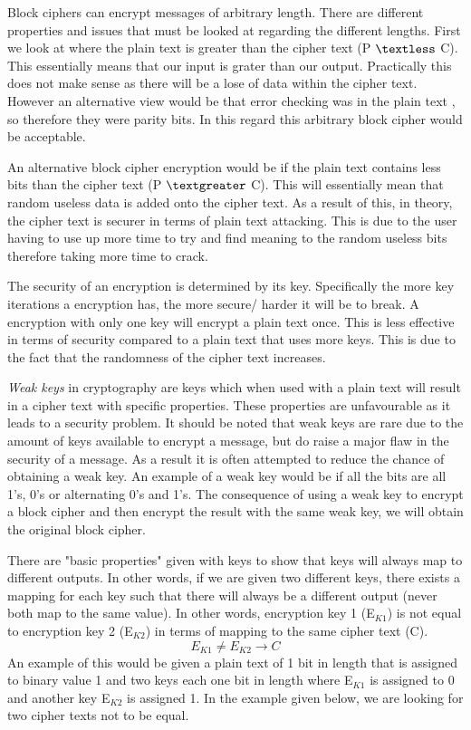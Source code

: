 \documentclass[11pt,a4paper]{report}
\begin{document}
Block ciphers can encrypt messages of arbitrary length. There are different properties and issues that must be looked at regarding the different lengths. First we look at where the plain text is greater than the cipher text (P $\textless$ C). This essentially means that our input is grater than our output. Practically this does not make sense as there will be a lose of data within the cipher text. However an alternative view would be that error checking was in the plain text , so therefore they were parity bits. In this regard this arbitrary block cipher would be acceptable.

An alternative block cipher encryption would be if the plain text contains less bits than the cipher text (P $\textgreater$ C). This will essentially mean that random useless data is added onto the cipher text. As a result of this, in theory, the cipher text is securer in terms of plain text attacking. This is due to the user having to use up more time to try and find meaning to the random useless bits therefore taking more time to crack.

The security of an encryption is determined by its key. Specifically the more key iterations a encryption has, the more secure/ harder it will be to break. A encryption with only one key will encrypt a plain text once. This is less effective in terms of security compared to a plain text that uses more keys. This is due to the fact that the randomness of the cipher text increases.

\emph{Weak keys} in cryptography are keys which when used with a plain text will result in a cipher text with specific properties. These properties are unfavourable as it leads to a security problem. It should be noted that weak keys are rare due to the amount of keys available to encrypt a message, but do raise a major flaw in the security of a message. As a result it is often attempted to reduce the chance of obtaining a weak key. An example of a weak key would be if all the bits are all 1's, 0's or alternating 0's and 1's. The consequence of using a weak key to encrypt a block cipher and then encrypt the result with the same weak key, we will obtain the original block cipher.











There are "basic properties" given with keys to show that keys will always map to different outputs. In other words, if we are given two different keys, there exists a mapping for each key such that there will always be a different output (never both map to the same value). In other words, encryption key 1 (E$_{K1}$) is not equal to encryption key 2 (E$_{K2}$) in terms of mapping to the same cipher text (C).
\begin{displaymath}
E_{K1} \neq E_{K2} \rightarrow C
\end{displaymath}
An example of this would be given a plain text of 1 bit in length that is assigned to binary value 1 and two keys each one bit in length where E$_{K1}$ is assigned to 0 and another key E$_{K2}$ is assigned 1. In the example given below, we are looking for two cipher texts not to be equal.
\end{document}

